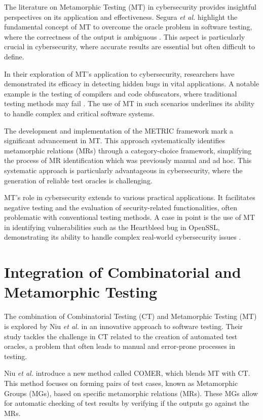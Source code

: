 The literature on Metamorphic Testing (MT) in cybersecurity provides insightful perspectives on its application and effectiveness. Segura \textit{et al.} highlight the fundamental concept of MT to overcome the oracle problem in software testing, where the correctness of the output is ambiguous \cite{CybersecurityMT}. This aspect is particularly crucial in cybersecurity, where accurate results are essential but often difficult to define.

In their exploration of MT's application to cybersecurity, researchers have demonstrated its efficacy in detecting hidden bugs in vital applications. A notable example is the testing of compilers and code obfuscators, where traditional testing methods may fail \cite{CybersecurityMT} \cite{GLSLFuzz}. The use of MT in such scenarios underlines its ability to handle complex and critical software systems.

The development and implementation of the METRIC framework \cite{ChenPoon2016} mark a significant advancement in MT. This approach systematically identifies metamorphic relations (MRs) through a category-choice framework, simplifying the process of MR identification which was previously manual and ad hoc. This systematic approach is particularly advantageous in cybersecurity, where the generation of reliable test oracles is challenging.

MT's role in cybersecurity extends to various practical applications. It facilitates negative testing and the evaluation of security-related functionalities, often problematic with conventional testing methods. A case in point is the use of MT in identifying vulnerabilities such as the Heartbleed bug in OpenSSL, demonstrating its ability to handle complex real-world cybersecurity issues \cite{OpenSSLMT}.

\section{Integration of Combinatorial and Metamorphic Testing}

The combination of Combinatorial Testing (CT) and Metamorphic Testing (MT) is explored by Niu \textit{et al.} \cite{comer} in an innovative approach to software testing. Their study tackles the challenge in CT related to the creation of automated test oracles, a problem that often leads to manual and error-prone processes in testing.

Niu \textit{et al.} introduce a new method called COMER, which blends MT with CT. This method focuses on forming pairs of test cases, known as Metamorphic Groups (MGs), based on specific metamorphic relations (MRs). These MGs allow for automatic checking of test results by verifying if the outputs go against the MRs.

